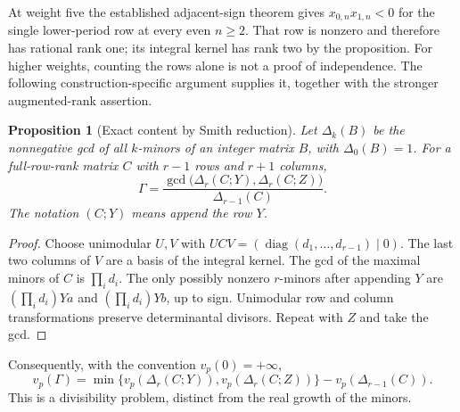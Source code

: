 \documentclass[11pt]{article}
\newtheorem{proposition}[theorem]{Proposition}
\theoremstyle{remark}
\DeclareMathOperator{\diag}{diag}
\begin{document}
At weight five the established adjacent-sign theorem gives
\(x_{0,n}x_{1,n}<0\) for the single lower-period row at every even
\(n\ge2\). That row is nonzero and therefore has rational rank one;
its integral kernel has rank two by the proposition.
For higher weights, counting the rows alone is not a proof of independence.
The following construction-specific argument supplies it, together with
the stronger augmented-rank assertion.

\begin{proposition}[Exact content by Smith reduction]
Let \(\Delta_k(B)\) be the nonnegative gcd of all \(k\)-minors of an
integer matrix \(B\), with \(\Delta_0(B)=1\).
For a full-row-rank matrix \(C\) with \(r-1\) rows and \(r+1\) columns,
\begin{equation}
 \Gamma=
 \frac{\gcd\bigl(\Delta_r(C;Y),\Delta_r(C;Z)\bigr)}
      {\Delta_{r-1}(C)}.
 \label{eq:smith}
\end{equation}
The notation \((C;Y)\) means append the row \(Y\).
\end{proposition}
\begin{proof}
Choose unimodular \(U,V\) with
\(UCV=(\diag(d_1,\ldots,d_{r-1})\mid0)\).
The last two columns of \(V\) are a basis of the integral kernel.
The gcd of the maximal minors of \(C\) is \(\prod_i d_i\).
The only possibly nonzero \(r\)-minors after appending \(Y\) are
\((\prod_i d_i)Ya\) and \((\prod_i d_i)Yb\), up to sign.
Unimodular row and column transformations preserve determinantal
divisors. Repeat with \(Z\) and take the gcd.
\end{proof}
Consequently, with the convention \(v_p(0)=+\infty\),
\begin{equation}
 v_p(\Gamma)=
 \min\{v_p(\Delta_r(C;Y)),v_p(\Delta_r(C;Z))\}
       -v_p(\Delta_{r-1}(C)).
 \label{eq:valuation}
\end{equation}
This is a divisibility problem, distinct from the real growth of the minors.
\end{document}
